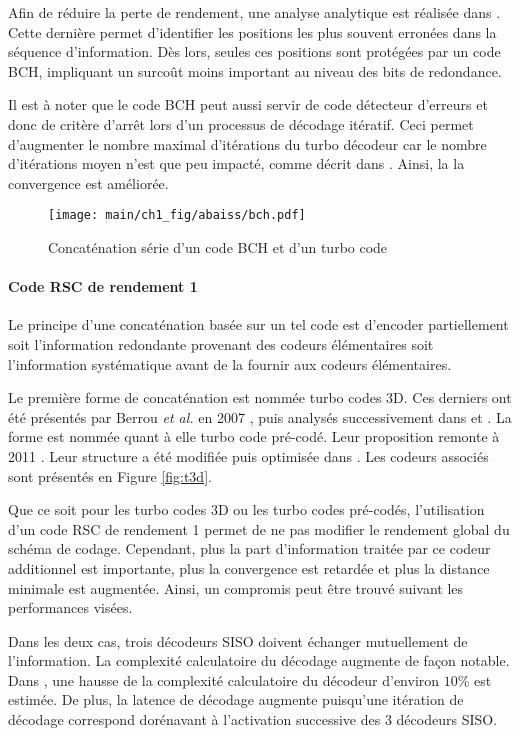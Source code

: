 Afin de réduire la perte de rendement, une analyse analytique est réalisée dans \cite{narayananBCH}. Cette dernière 
permet d’identifier les positions les plus souvent erronées dans la séquence d'information. Dès lors, seules ces 
positions sont protégées par un code BCH, impliquant un surcoût moins important au niveau des bits de redondance.

Il est à noter que le code BCH peut aussi servir de code détecteur d'erreurs et donc de critère d’arrêt lors d'un 
processus de décodage itératif. Ceci permet d'augmenter le nombre maximal d'itérations du turbo décodeur car le nombre 
d'itérations moyen n'est que peu impacté, comme décrit dans \cite{takeshitaBCH}. Ainsi, la la convergence est améliorée.

\begin{figure}[!tb]
	\begin{center}
	\texttt{[image: main/ch1\_fig/abaiss/bch.pdf]}
	\end{center}
	\caption{Concaténation série d'un code BCH et d'un turbo code \label{fig:bchc}}
\end{figure}

\paragraph{Code RSC de rendement 1}
Le principe d'une concaténation basée sur un tel code est d'encoder partiellement soit l'information redondante 
provenant des codeurs élémentaires soit l'information systématique avant de la fournir aux codeurs élémentaires.

Le première forme de concaténation est nommée turbo codes 3D. Ces derniers ont été présentés par Berrou \textit{et al.} 
en 2007 \cite{TC3D_1}, puis analysés successivement dans \cite{TC3D_2} et \cite{TC3D_3}.
La forme est nommée quant à elle turbo code pré-codé. Leur proposition remonte à 2011 \cite{precoded}. Leur structure a 
été modifiée puis optimisée dans \cite{precoding}. Les codeurs associés sont présentés en Figure \ref{fig:t3d}.

Que ce soit pour les turbo codes 3D ou les turbo codes pré-codés, l'utilisation d'un code RSC de rendement 1 permet de 
ne pas modifier le rendement global du schéma de codage. Cependant, plus la part d'information traitée par ce codeur 
additionnel est importante, plus la convergence est retardée et plus la distance minimale est augmentée. Ainsi, un 
compromis peut être trouvé suivant les performances visées. 

Dans les deux cas, trois décodeurs SISO doivent échanger mutuellement de l'information. La complexité calculatoire du 
décodage augmente de façon notable. Dans \cite{TC3D_2}, une hausse de la complexité calculatoire du décodeur  d'environ 
$10\%$ est estimée. De plus, la latence de décodage augmente puisqu'une itération de décodage correspond dorénavant à 
l'activation successive des 3 décodeurs SISO.

